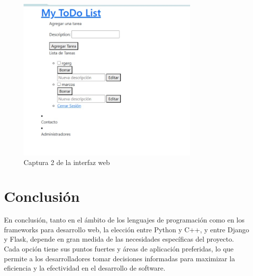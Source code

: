\documentclass[12pt, a4paper]{article}
\begin{document}
\begin{figure}[ht]
	\centering
	\includegraphics[width=0.8\textwidth]{images/interface2.png}
	\caption{Captura 2 de la interfaz web}
	\label{fig:interface2}
\end{figure}
	

	\section*{Conclusión}
	
	En conclusión, tanto en el ámbito de los lenguajes de programación como en los frameworks para desarrollo web, la elección entre Python y C++, y entre Django y Flask, depende en gran medida de las necesidades específicas del proyecto. Cada opción tiene sus puntos fuertes y áreas de aplicación preferidas, lo que permite a los desarrolladores tomar decisiones informadas para maximizar la eficiencia y la efectividad en el desarrollo de software.
	
\end{document}
